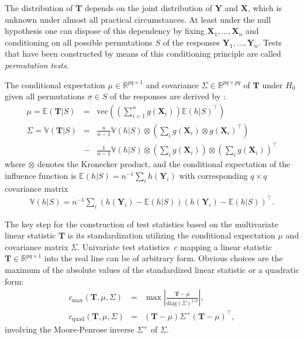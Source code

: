 \documentclass{article}
\newcommand{\R}{\mathbb{R} }
\newcommand{\V}{\mathbb{V}} %
\newcommand{\E}{\mathbb{E}} %
\newcommand{\X}{\mathbf{X}}
\newcommand{\Y}{\mathbf{Y}}
\newcommand{\T}{\mathbf{T}}
\renewcommand{\vec}{\text{vec}}
\begin{document}
The distribution of $\T$  depends on the joint distribution of $\Y$ and $\X$, 
which is unknown under almost all practical circumstances. 
At least under the null hypothesis one can dispose of this 
dependency by fixing $\X_1, \dots, \X_n$ and conditioning on all possible 
permutations $S$ of the responses $\Y_1, \dots, \Y_n$. Tests that have been 
constructed by means of this conditioning principle are called 
\emph{permutation tests}.

The conditional expectation $\mu \in \R^{pq \times 1}$ and covariance
$\Sigma \in \R^{pq \times pq}$ of $\T$ under $H_0$ given
all permutations $\sigma \in S$ of the responses are derived by
\cite{StrasserWeber1999}:
\begin{eqnarray*}
\mu = \E(\T | S) & = & \vec \left( \left( \sum_{i = 1}^n g(\X_i) \right)
\E(h | S)^\top \right) \\
\Sigma = \V(\T | S) & = &
    \frac{n}{n - 1}  \V(h | S) \otimes
        \left(\sum_i g(\X_i) \otimes  g(\X_i)^\top \right)
\\
& - & \frac{1}{n - 1}  \V(h | S)  \otimes \left(
        \sum_i g(\X_i) \right) \otimes \left( \sum_i g(\X_i)\right)^\top
\nonumber
\end{eqnarray*}
where $\otimes$ denotes the Kronecker product, and the conditional
expectation of the influence function is $\E(h | S) = n^{-1} \sum_i
h(\Y_i)$ with corresponding $q \times q$ covariance matrix
\begin{eqnarray*}
\V(h | S) = n^{-1} \sum_i \left(h(\Y_i) - \E(h | S) \right) \left(h(\Y_i) - \E(h | S)\right)^\top.
\end{eqnarray*}

The key step for the construction of test statistics based on the multivariate
linear statistic $\T$ is its standardization utilizing the 
conditional expectation $\mu$ and covariance matrix $\Sigma$. 
Univariate test statistics~$c$ mapping a linear
statistic $\T \in \R^{pq \times 1}$ 
into the real line can be of arbitrary form.  Obvious choices are
the maximum of the absolute values of the standardized linear statistic
or a quadratic form:
\begin{eqnarray*}
c_\text{max}(\T, \mu, \Sigma)  & = & \max \left| \frac{\T - \mu}{\text{diag}(\Sigma)^{1/2}} \right|, \\
c_\text{quad}(\T, \mu, \Sigma)  & = & (\T - \mu) \Sigma^+ (\T - \mu)^\top,
\end{eqnarray*}
involving the Moore-Penrose inverse $\Sigma^+$ of $\Sigma$.
\end{document}
